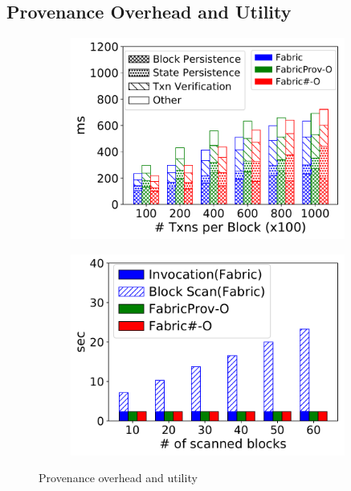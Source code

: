 \subsection{Provenance Overhead and Utility}
\label{sec:provenance:exps:util}
\begin{figure}[tp]
	\centering
    \begin{subfigure}{0.45\textwidth}
      \includegraphics[width=0.99\textwidth]{chart/provenance/ycsb_breakdown.pdf}
      \caption{}
      \label{chart:provenance:ycsb_breakdown}
    \end{subfigure}
    \begin{subfigure}{0.45\textwidth}
      \includegraphics[width=0.99\textwidth]{chart/provenance/smallbank_util.pdf}
      \caption{}
      \label{chart:provenance:smallbank_util}
    \end{subfigure}
    \caption{Provenance overhead and utility }
\end{figure}
